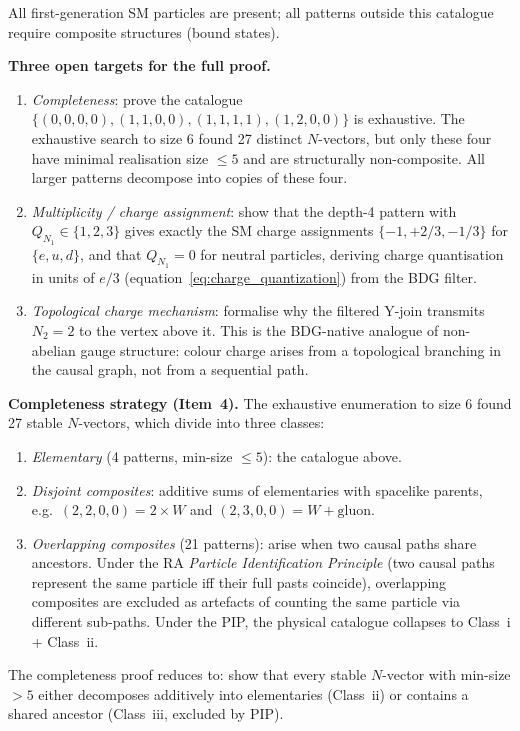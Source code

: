 \documentclass[11pt,a4paper]{article}
\begin{document}
All first-generation SM particles are present; all patterns outside this
catalogue require composite structures (bound states).

\textbf{Three open targets for the full proof.}
\begin{enumerate}[noitemsep]
\item \emph{Completeness}: prove the catalogue
  $\{(0,0,0,0),(1,1,0,0),(1,1,1,1),(1,2,0,0)\}$
  is exhaustive. The exhaustive search to size 6 found 27 distinct
  $N$-vectors, but only these four have minimal realisation size $\leq 5$
  and are structurally non-composite. All larger patterns decompose into
  copies of these four.
\item \emph{Multiplicity / charge assignment}: show that the depth-4
  pattern with $Q_{N_1} \in \{1,2,3\}$ gives exactly the SM charge
  assignments $\{-1, +2/3, -1/3\}$ for $\{e, u, d\}$, and that
  $Q_{N_1} = 0$ for neutral particles, deriving charge quantisation
  in units of $e/3$ (equation~\eqref{eq:charge_quantization}) from the BDG filter.
\item \emph{Topological charge mechanism}: formalise why the filtered
  Y-join transmits $N_2 = 2$ to the vertex above it. This is the
  BDG-native analogue of non-abelian gauge structure: colour charge
  arises from a topological branching in the causal graph, not from a
  sequential path.
\end{enumerate}

\textbf{Completeness strategy (Item~4).}
The exhaustive enumeration to size 6 found 27 stable $N$-vectors, which divide
into three classes:
\begin{enumerate}[noitemsep,label=\roman*.]
  \item \emph{Elementary} (4 patterns, min-size $\leq 5$): the catalogue above.
  \item \emph{Disjoint composites}: additive sums of elementaries with spacelike
  parents, e.g.\ $(2,2,0,0) = 2\times W$ and $(2,3,0,0) = W + \mathrm{gluon}$.
  \item \emph{Overlapping composites} (21 patterns): arise when two causal paths
  share ancestors. Under the RA \emph{Particle Identification Principle}
  (two causal paths represent the same particle iff their full pasts coincide),
  overlapping composites are excluded as artefacts of counting the same
  particle via different sub-paths. Under the PIP, the physical catalogue
  collapses to Class~i + Class~ii.
\end{enumerate}
The completeness proof reduces to: show that every stable $N$-vector with
min-size $> 5$ either decomposes additively into elementaries (Class~ii) or
contains a shared ancestor (Class~iii, excluded by PIP).
\end{document}
